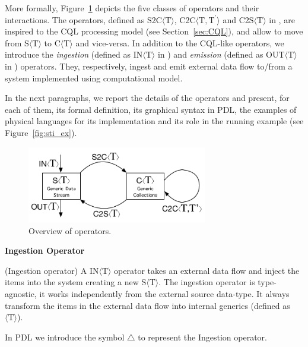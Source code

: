 More formally, Figure~\ref{fig:cm-op} depicts the five classes of \river{} operators and their interactions. 
The operators, defined as S2C$\langle\mathrm{T}\rangle$, C2C$\langle\mathrm{T},\mathrm{T^{\prime}}\rangle$ and C2S$\langle\mathrm{T}\rangle$ in \river{}, are inspired to the CQL processing model (see Section~\ref{sec:CQL}), and allow to move from S$\langle\mathrm{T}\rangle$ to C$\langle\mathrm{T}\rangle$ and vice-versa.
In addition to the CQL-like operators, we introduce the \textit{ingestion} (defined as IN$\langle\mathrm{T}\rangle$ in \river{}) and \textit{emission} (defined as OUT$\langle\mathrm{T}\rangle$ in \river{}) operators.
They, respectively, ingest and emit external data flow to/from a system implemented using \river{} computational model.

In the next paragraphs, we report the details of the operators and present, for each of them, its formal definition, its graphical syntax in PDL, the examples of physical languages for its implementation and its role in the running example (see Figure~\ref{fig:sti_ex}).

\begin{figure}[t]
    \centering
    \includegraphics[width=0.7\textwidth]{img/computational-model-operators}
    \caption{Overview of \textnormal{\protect\river{}} operators.}
    \label{fig:cm-op}
\end{figure}

\pagebreak

\medskip
\noindent
\textbf{Ingestion Operator}
\medskip

\begin{Definition}
(Ingestion operator) A IN$\langle\mathrm{T}\rangle$ operator takes an external data flow and inject the items into the system creating a new S$\langle\mathrm{T}\rangle$. 
The ingestion operator is type-agnostic, it works independently from the external source data-type.
It always transform the items in the external data flow into internal generics (defined as $\langle\mathrm{T}\rangle$).
\end{Definition}

\noindent
In PDL we introduce the symbol $\bigtriangleup$ to represent the Ingestion operator.

